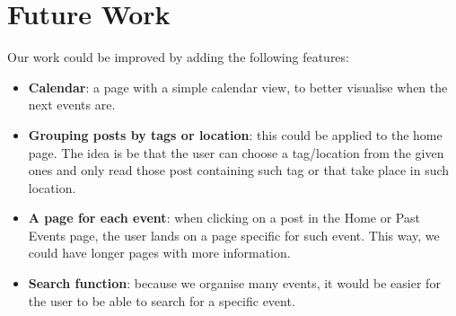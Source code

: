 \documentclass[a4paper]{article}
\begin{document}
	\section{Future Work}
	Our work could be improved by adding the following features:
	\begin{itemize}
		\item \textbf{Calendar}: a page with a simple calendar view, to better visualise when the next events are.
		\item \textbf{Grouping posts by tags or location}: this could be applied to the home page. The idea is be that the user can choose a tag/location from the given ones and only read those post containing such tag or that take place in such location.
		\item \textbf{A page for each event}: when clicking on a post in the Home or Past Events page, the user lands on a page specific for such event. This way, we could have longer pages with more information.
		\item \textbf{Search function}: because we organise many events, it would be easier for the user to be able to search for a specific event.
	\end{itemize}
	
\end{document}
